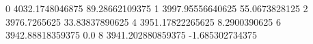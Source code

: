 0 4032.1748046875 89.28662109375
1 3997.95556640625 55.0673828125
2 3976.7265625 33.83837890625
4 3951.17822265625 8.2900390625
6 3942.88818359375 0.0
8 3941.202880859375 -1.685302734375
